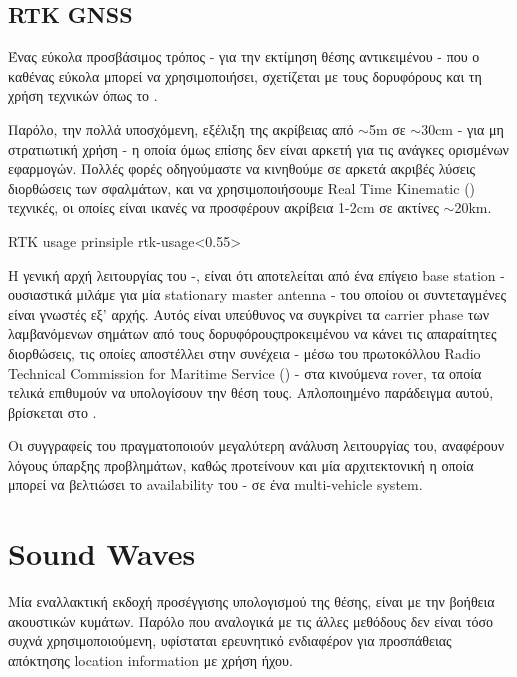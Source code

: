 \subsection{RTK GNSS}
Ένας εύκολα προσβάσιμος τρόπος - για την εκτίμηση θέσης αντικειμένου - που ο καθένας εύκολα μπορεί να χρησιμοποιήσει, σχετίζεται με τους δορυφόρους και τη χρήση  τεχνικών όπως το .

Παρόλο, την πολλά υποσχόμενη, εξέλιξη της ακρίβειας από $\sim$5m \cite{gps-accuracy}
σε $\sim$30cm \cite{superaccurate-gps} - για μη στρατιωτική χρήση -
η οποία όμως επίσης δεν είναι αρκετή για τις ανάγκες ορισμένων εφαρμογών. 
Πολλές φορές οδηγούμαστε να κινηθούμε σε αρκετά ακριβές 
λύσεις διορθώσεις των σφαλμάτων, και να χρησιμοποιήσουμε  Real Time Kinematic () \cite{rtk-gps} τεχνικές, οι οποίες είναι ικανές να προσφέρουν ακρίβεια 1-2cm σε ακτίνες $\sim$20km. 

{RTK usage prinsiple}
{rtk-usage}<0.55>

Η γενική αρχή λειτουργίας του -, είναι ότι αποτελείται από ένα επίγειο
base station - ουσιαστικά μιλάμε για μία stationary  master antenna - του οποίου οι
συντεταγμένες είναι γνωστές εξ' αρχής. Αυτός είναι υπεύθυνος να συ\-γκρί\-νει τα carrier phase των λαμβανόμενων σημάτων από τους δορυφόρους\udot προκειμένου να κάνει τις απαραίτητες διορθώσεις, τις
οποίες αποστέλλει στην συνέχεια - μέσω του πρωτοκόλλου Radio Technical Commission for Maritime Service
() - στα κινούμενα rover, τα οποία τελικά επιθυμούν να υπολογίσουν την θέση τους. Απλοποιημένο παράδειγμα αυτού, βρίσκεται στο .

Οι συγγραφείς του \cite{rtk-gps-drone-localization} πραγματοποιούν μεγαλύτερη ανάλυση λει\-του\-ργίας του, α\-να\-φέ\-ρουν λόγους ύπαρξης προβλημάτων, καθώς προτείνουν και μία αρχιτεκτονική η οποία μπορεί να βελτιώσει το availability του - σε ένα multi-vehicle system.

\section{Sound Waves}
Μία εναλλακτική εκδοχή προσέγγισης υπολογισμού της θέσης, είναι με την βοήθεια ακουστικών κυμάτων. Παρόλο που αναλογικά με τις άλλες μεθόδους δεν είναι τόσο συχνά χρησιμοποιούμενη, υφίσταται ερευνητικό ενδιαφέρον για προσπάθειας α\-πό\-κτη\-σης location information με χρήση ήχου. 

